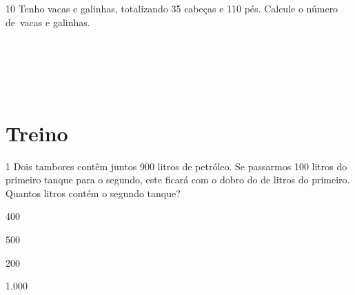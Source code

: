 \pagebreak

\num{10} Tenho vacas e galinhas, totalizando 35 cabeças e 110 pés. Calcule o
número de~vacas e galinhas.

\\
\\
\\
\\

\section{Treino}


\num{1} Dois tambores contêm juntos 900 litros de petróleo. Se passarmos 100
litros do primeiro tanque para o segundo, este ficará com o dobro do de
litros do primeiro. Quantos litros contém o segundo tanque?

\begin{escolha}[itemsep=0pt]
\item 400
\item 500
\item 200
\item 1.000
\end{escolha}










